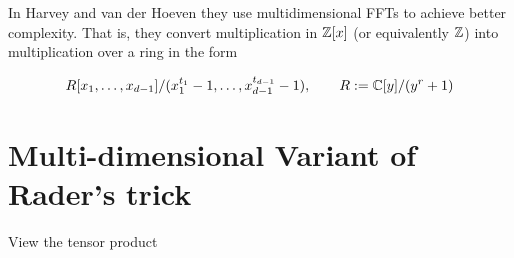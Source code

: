 In Harvey and van der Hoeven they use multidimensional FFTs to achieve better complexity. That is, they convert multiplication in ${\mathbb Z}[x]$ (or equivalently ${\mathbb Z}$) into multiplication over a ring in the form 

\[
    R[x_1, \ldots, x_{d-1}] / (x_1^{t_1} - 1, \ldots, x_{d-1}^{t_{d-1}} - 1), \qquad R := \mathbb{C}[y]/(y^r + 1)
\]

\section{Multi-dimensional Variant of Rader's trick}%
\label{sec:multi_dimensional_variant_of_rader_s_trick}

View the tensor product 
